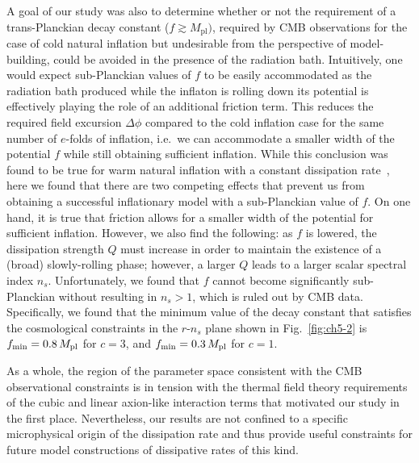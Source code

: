 A goal of our study was also to determine whether or not the requirement of a trans-Planckian decay constant ($f\gtrsim M_{\mathrm{pl}})$, required by CMB observations for the case of cold natural inflation but undesirable from the perspective of model-building, could be avoided in the presence of the radiation bath. Intuitively, one would expect sub-Planckian values of $f$ to be easily accommodated as the radiation bath produced while the inflaton is rolling down its potential is effectively playing the role of an additional friction term. This reduces the required field excursion $\Delta \phi$ compared to the cold inflation case for the same number of $e$-folds of inflation, i.e.\ we can accommodate a smaller width of the potential $f$ while still obtaining sufficient inflation. While this conclusion was found to be true for warm natural inflation with a constant dissipation rate~\cite{Visinelli:2011jy}, here we found that there are two competing effects that prevent us from obtaining a successful inflationary model with a sub-Planckian value of $f$. On one hand, it is true that friction allows for a smaller width of the potential for sufficient inflation. However, we also find the following: as $f$ is lowered, the dissipation strength $Q$ must increase in order to maintain the existence of a (broad) slowly-rolling phase; however, a larger $Q$ leads to a larger scalar spectral index $n_s$. Unfortunately, we found that $f$ cannot become significantly sub-Planckian without resulting in $n_s>1$, which is ruled out by CMB data. Specifically, we found that the minimum value of the decay constant that satisfies the cosmological constraints in the $r$-$n_s$ plane shown in Fig.~\ref{fig:ch5-2} is $f_{\rm min} = 0.8\,M_{\mathrm{pl}}$ for $c=3$, and $f_{\rm min} = 0.3\,M_{\mathrm{pl}}$ for $c=1$.

As a whole, the region of the parameter space consistent with the CMB observational constraints is in tension with the thermal field theory requirements of the cubic and linear axion-like interaction terms that motivated our study in the first place. Nevertheless, our results are not confined to a specific microphysical origin of the dissipation rate and thus provide useful constraints for future model constructions of dissipative rates of this kind.

